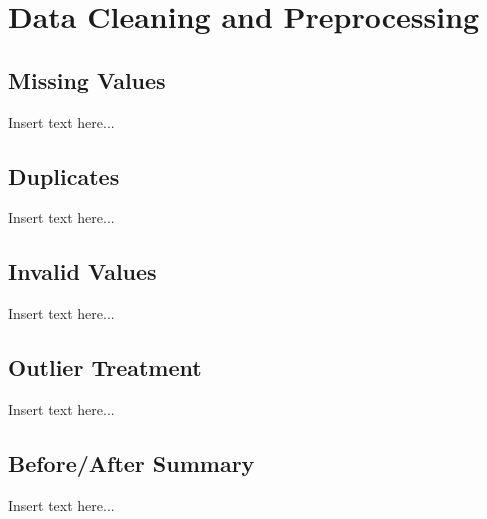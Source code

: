 \section{Data Cleaning and Preprocessing}
\subsection{Missing Values}
Insert text here...

\subsection{Duplicates}
Insert text here...

\subsection{Invalid Values}
Insert text here...

\subsection{Outlier Treatment}
Insert text here...

\subsection{Before/After Summary}
Insert text here...
